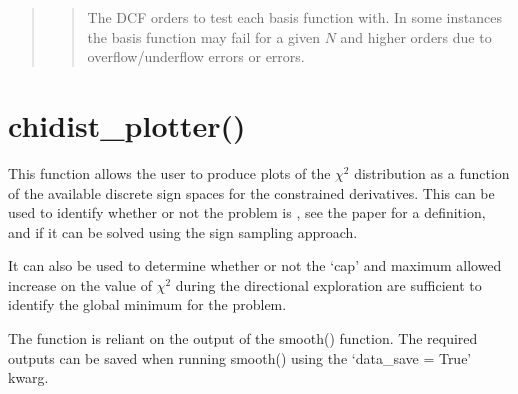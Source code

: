 \documentclass[letterpaper,10pt,english]{sphinxmanual}
\begin{document}
\begin{fulllineitems}
\begin{quote}
\begin{quote}
\begin{DUlineblock}{0em}
\item[] The DCF orders to test each basis function with. In
some instances the basis function may fail for a given \({N}\)
and higher orders due to overflow/underflow errors or 
errors.
\end{DUlineblock}
\end{quote}
\end{quote}

\end{fulllineitems}



\section{chidist\_plotter()}
\label{\detokenize{source/maxsmooth:module-maxsmooth.chidist_plotter}}\label{\detokenize{source/maxsmooth:chidist-plotter}}
This function allows the user to produce plots of the \({\chi^2}\)
distribution as a function of the available discrete sign spaces for the
constrained derivatives. This can be used to identify whether or not the
problem is , see the  paper for a definition,
and if it can be solved using the sign sampling approach.

It can also be used to determine whether or not the ‘cap’ and maximum allowed
increase on the value of \({\chi^2}\) during the directional exploration
are sufficient to identify the global minimum for the problem.

The function is reliant on the output of the  smooth() function.
The required outputs can be saved when running smooth()
using the ‘data\_save = True’ kwarg.
\end{document}
